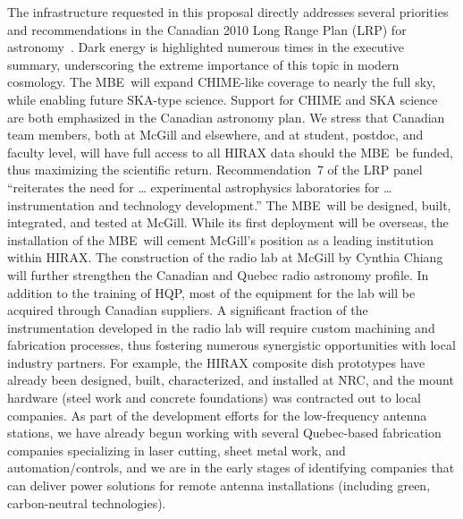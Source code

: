 \documentclass[letterpaper,11pt,preprint]{aastex}
\makeatletter
\newcommand{\mbe}{{\rm MBE}}
\def\section{\@startsection {section}{1}{\z@}{1.0ex plus 
1ex minus .2ex}{.2ex plus .2ex}{\large\bf}}
\makeatother
\begin{document}
\section{Benefits to Canada}

The infrastructure requested in this proposal directly addresses
several priorities and recommendations in the Canadian 2010 Long Range
Plan (LRP) for astronomy~\citep{lrp}.  Dark energy is highlighted
numerous times in the executive summary, underscoring the extreme
importance of this topic in modern cosmology.  The \mbe\ will expand
CHIME-like coverage to nearly the full sky, while enabling future
SKA-type science.  Support for CHIME and SKA science are both
emphasized in the Canadian astronomy plan.  {\color{red}We stress that
  Canadian team members, both at McGill and elsewhere, and at student,
  postdoc, and faculty level, will have full access to all HIRAX data
  should the \mbe\ be funded, thus maximizing the scientific return.}
Recommendation~7 of the LRP panel ``reiterates the need for \ldots
experimental astrophysics laboratories for \ldots instrumentation and
technology development.''  The \mbe\ will be designed, built,
integrated, and tested at McGill.  While its first deployment will be
overseas, the installation of the \mbe\ will cement McGill's position
as a leading institution within HIRAX.  The construction of the radio
lab at McGill by Cynthia Chiang will further strengthen the Canadian
and Quebec radio astronomy profile.  In addition to the training of
HQP, most of the equipment for the lab will be acquired through
Canadian suppliers.  {\color{red} A significant fraction of the
  instrumentation developed in the radio lab will require custom
  machining and fabrication processes, thus fostering numerous
  synergistic opportunities with local industry partners.  For
  example, the HIRAX composite dish prototypes have already been
  designed, built, characterized, and installed at NRC, and the mount
  hardware (steel work and concrete foundations) was contracted out to
  local companies.  As part of the development efforts for the
  low-frequency antenna stations, we have already begun working with
  several Quebec-based fabrication companies specializing in laser
  cutting, sheet metal work, and automation/controls, and we are in
  the early stages of identifying companies that can deliver power
  solutions for remote antenna installations (including green,
  carbon-neutral technologies).}

\end{document}
